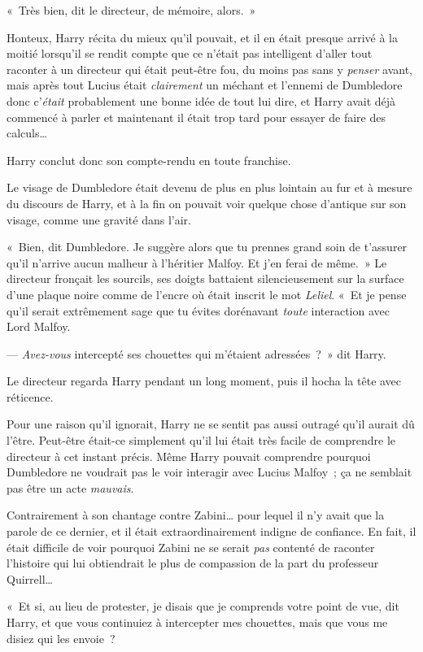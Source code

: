 «~Très bien, dit le directeur, de mémoire, alors.~»

Honteux, Harry récita du mieux qu'il pouvait, et il en était presque arrivé à la moitié lorsqu'il se rendit compte que ce n'était pas intelligent d'aller tout raconter à un directeur qui était peut-être fou, du moins pas sans y \emph{penser} avant, mais après tout Lucius était \emph{clairement} un méchant et l'ennemi de Dumbledore donc c'\emph{était} probablement une bonne idée de tout lui dire, et Harry avait déjà commencé à parler et maintenant il était trop tard pour essayer de faire des calculs…

Harry conclut donc son compte-rendu en toute franchise.

Le visage de Dumbledore était devenu de plus en plus lointain au fur et à mesure du discours de Harry, et à la fin on pouvait voir quelque chose d'antique sur son visage, comme une gravité dans l'air.

«~Bien, dit Dumbledore. Je suggère alors que tu prennes grand soin de t'assurer qu'il n'arrive aucun malheur à l'héritier Malfoy. Et j'en ferai de même.~» Le directeur fronçait les sourcils, ses doigts battaient silencieusement sur la surface d'une plaque noire comme de l'encre où était inscrit le mot \emph{Leliel}. «~Et je pense qu'il serait extrêmement sage que tu évites dorénavant \emph{toute} interaction avec Lord Malfoy.

--- \emph{Avez-vous} intercepté ses chouettes qui m'étaient adressées~?~» dit Harry.

Le directeur regarda Harry pendant un long moment, puis il hocha la tête avec réticence.

Pour une raison qu'il ignorait, Harry ne se sentit pas aussi outragé qu'il aurait dû l'être. Peut-être était-ce simplement qu'il lui était très facile de comprendre le directeur à cet instant précis. Même Harry pouvait comprendre pourquoi Dumbledore ne voudrait pas le voir interagir avec Lucius Malfoy~; ça ne semblait pas être un acte \emph{mauvais}.

Contrairement à son chantage contre Zabini… pour lequel il n'y avait que la parole de ce dernier, et il était extraordinairement indigne de confiance. En fait, il était difficile de voir pourquoi Zabini ne se serait \emph{pas} contenté de raconter l'histoire qui lui obtiendrait le plus de compassion de la part du professeur Quirrell…

«~Et si, au lieu de protester, je disais que je comprends votre point de vue, dit Harry, et que vous continuiez à intercepter mes chouettes, mais que vous me disiez qui les envoie~?

